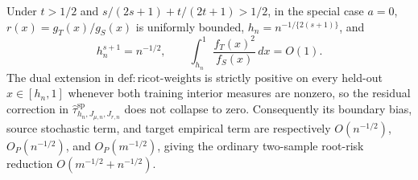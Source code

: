 Under \(t>1/2\) and \(s/(2s+1)+t/(2t+1)>1/2\), in the special case \(a=0\), \(r(x)=g_T(x)/g_S(x)\) is uniformly bounded, \(h_n=n^{-1/\{2(s+1)\}}\), and
\[
h_n^{s+1}=n^{-1/2},\qquad \int_{h_n}^1\frac{f_T(x)^2}{f_S(x)}\,dx=O(1).
\]
The dual extension in \(\mathrm{def:ricot\text{-}weights}\) is strictly positive on every held-out \(x\in[h_n,1]\) whenever both training interior measures are nonzero, so the residual correction in \(\widehat\tau^{\mathrm{sp}}_{h_n,J_{\mu,n},J_{r,n}}\) does not collapse to zero. Consequently its boundary bias, source stochastic term, and target empirical term are respectively \(O(n^{-1/2})\), \(O_P(n^{-1/2})\), and \(O_P(m^{-1/2})\), giving the ordinary two-sample root-risk reduction \(O(m^{-1/2}+n^{-1/2})\).